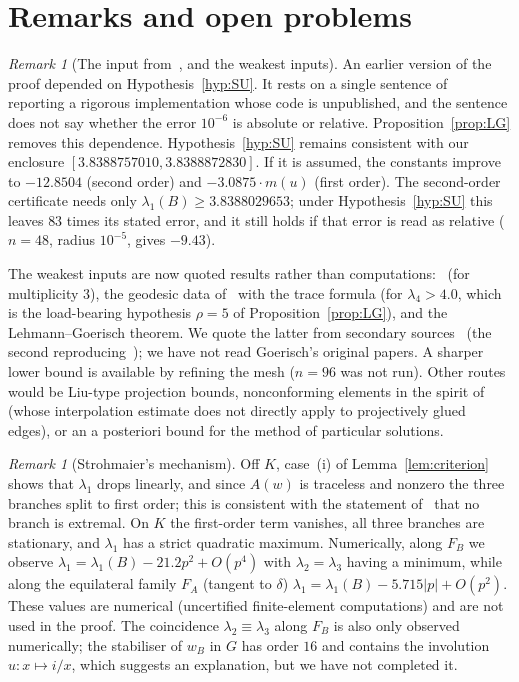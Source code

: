 \documentclass[11pt]{amsart}
\theoremstyle{definition}
\theoremstyle{remark}
\newtheorem{remark}[theorem]{Remark}
\newcommand{\wB}{w_B}
\newcommand{\FB}{F_B}
\newcommand{\FA}{F_A}
\begin{document}
\section{Remarks and open problems}\label{sec:remarks}

\begin{remark}[The input from~\cite{SU13}, and the weakest inputs]\label{rem:SU}
An earlier version of the proof depended on Hypothesis~\ref{hyp:SU}. It rests on a single sentence
of~\cite[\S5]{SU13} reporting a rigorous implementation whose code is unpublished, and the
sentence does not say whether the error $10^{-6}$ is absolute or relative. Proposition~\ref{prop:LG}
removes this dependence. Hypothesis~\ref{hyp:SU} remains consistent with our enclosure
$[3.8388757010,3.8388872830]$. If it is assumed, the constants improve to $-12.8504$ (second order)
and $-3.0875\cdot m(u)$ (first order). The second-order certificate needs only
$\lambda_1(B)\ge3.8388029653$; under Hypothesis~\ref{hyp:SU} this leaves $83$ times its stated error,
and it still holds if that error is read as relative ($n=48$, radius $10^{-5}$, gives $-9.43$).

The weakest inputs are now quoted results rather than computations:~\cite[Lemmas~7.2--7.3]{FBP-K}
(for multiplicity $3$), the geodesic data of~\cite[\S7.4]{FBP-K} with the trace formula (for
$\lambda_4>4.0$, which is the load-bearing hypothesis $\rho=5$ of Proposition~\ref{prop:LG}), and the
Lehmann--Goerisch theorem. We quote the latter from secondary sources~\cite{LiuPlum,Vej18}
(the second reproducing~\cite{BMPW}); we have not read Goerisch's original papers. A sharper lower
bound is available by refining the mesh ($n=96$ was not run). Other routes would be Liu-type
projection bounds, nonconforming elements in the spirit of~\cite{CG14} (whose interpolation estimate
does not directly apply to projectively glued edges), or an a posteriori bound for the method of
particular solutions.
\end{remark}

\begin{remark}[Strohmaier's mechanism]\label{rem:Str16}
Off $K$, case~(i) of Lemma~\ref{lem:criterion} shows that $\lambda_1$ drops linearly, and since $A(w)$ is
traceless and nonzero the three branches split to first order; this is consistent with the
statement of~\cite{Str16} that no branch is extremal. On $K$ the first-order term vanishes, all three
branches are stationary, and $\lambda_1$ has a strict quadratic maximum. Numerically, along $\FB$ we
observe $\lambda_1=\lambda_1(B)-21.2p^2+O(p^4)$ with $\lambda_2=\lambda_3$ having a minimum, while along the
equilateral family $\FA$ (tangent to $\delta$) $\lambda_1=\lambda_1(B)-5.715|p|+O(p^2)$. These values are
numerical (uncertified finite-element computations) and are not used in the proof. The coincidence
$\lambda_2\equiv\lambda_3$ along $\FB$ is also only observed numerically; the stabiliser of $\wB$ in $G$ has
order $16$ and contains the involution $u\colon x\mapsto i/x$, which suggests an explanation, but we
have not completed it.
\end{remark}
\end{document}
